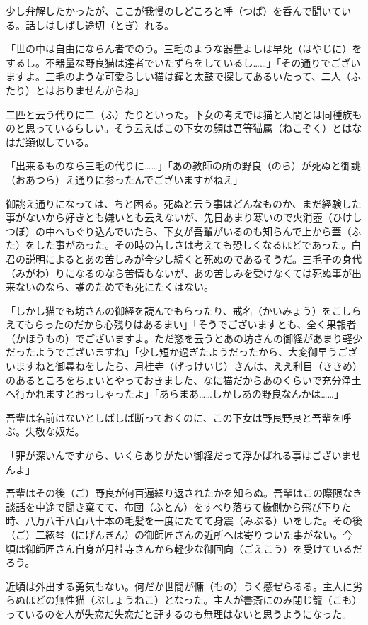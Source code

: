 \documentclass{book}
\begin{document}
少し弁解したかったが、ここが我慢のしどころと唾（つば）を呑んで聞いている。話しはしばし途切（とぎ）れる。

「世の中は自由にならん者でのう。三毛のような器量よしは早死（はやじに）をするし。不器量な野良猫は達者でいたずらをしているし\ldots{}\ldots{}」「その通りでございますよ。三毛のような可愛らしい猫は鐘と太鼓で探してあるいたって、二人（ふたり）とはおりませんからね」

二匹と云う代りに二（ふ）たりといった。下女の考えでは猫と人間とは同種族ものと思っているらしい。そう云えばこの下女の顔は吾等猫属（ねこぞく）とはなはだ類似している。

「出来るものなら三毛の代りに\ldots{}\ldots{}」「あの教師の所の野良（のら）が死ぬと御誂（おあつら）え通りに参ったんでございますがねえ」

御誂え通りになっては、ちと困る。死ぬと云う事はどんなものか、まだ経験した事がないから好きとも嫌いとも云えないが、先日あまり寒いので火消壺（ひけしつぼ）の中へもぐり込んでいたら、下女が吾輩がいるのも知らんで上から蓋（ふた）をした事があった。その時の苦しさは考えても恐しくなるほどであった。白君の説明によるとあの苦しみが今少し続くと死ぬのであるそうだ。三毛子の身代（みがわ）りになるのなら苦情もないが、あの苦しみを受けなくては死ぬ事が出来ないのなら、誰のためでも死にたくはない。

「しかし猫でも坊さんの御経を読んでもらったり、戒名（かいみょう）をこしらえてもらったのだから心残りはあるまい」「そうでございますとも、全く果報者（かほうもの）でございますよ。ただ慾を云うとあの坊さんの御経があまり軽少だったようでございますね」「少し短か過ぎたようだったから、大変御早うございますねと御尋ねをしたら、月桂寺（げっけいじ）さんは、ええ利目（ききめ）のあるところをちょいとやっておきました、なに猫だからあのくらいで充分浄土へ行かれますとおっしゃったよ」「あらまあ\ldots{}\ldots{}しかしあの野良なんかは\ldots{}\ldots{}」

吾輩は名前はないとしばしば断っておくのに、この下女は野良野良と吾輩を呼ぶ。失敬な奴だ。

「罪が深いんですから、いくらありがたい御経だって浮かばれる事はございませんよ」

吾輩はその後（ご）野良が何百遍繰り返されたかを知らぬ。吾輩はこの際限なき談話を中途で聞き棄てて、布団（ふとん）をすべり落ちて椽側から飛び下りた時、八万八千八百八十本の毛髪を一度にたてて身震（みぶる）いをした。その後（ご）二絃琴（にげんきん）の御師匠さんの近所へは寄りついた事がない。今頃は御師匠さん自身が月桂寺さんから軽少な御回向（ごえこう）を受けているだろう。

近頃は外出する勇気もない。何だか世間が慵（もの）うく感ぜらるる。主人に劣らぬほどの無性猫（ぶしょうねこ）となった。主人が書斎にのみ閉じ籠（こも）っているのを人が失恋だ失恋だと評するのも無理はないと思うようになった。
\end{document}

